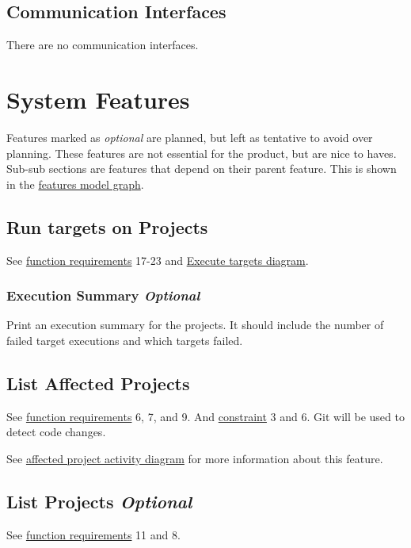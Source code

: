 \documentclass[11pt]{article}
\begin{document}
\subsection{Communication Interfaces}

There are no communication interfaces.

\section{System Features}

Features marked as \emph{optional} are planned, but left as tentative to avoid
over planning. These features are not essential for the product, but are nice to
haves. Sub-sub sections are features that depend on their parent feature. This
is shown in the \hyperref[fig:feature]{features model graph}.\\

\subsection{Run \Glspl{target} on Projects}

See \hyperref[sec:fun_req]{function requirements} 17-23 and
\hyperref[fig:act_exec]{Execute targets diagram}.

\subsubsection{Execution Summary \emph{Optional}}

Print an execution summary for the projects. It should include the number of
failed \glspl{target execution} and which \glspl{target} failed.

\subsection{List Affected Projects}

See \hyperref[sec:fun_req]{function requirements} 6, 7, and 9. And
\hyperref[sec:constraints]{constraint} 3 and 6. Git will be used to detect code changes.

See \hyperref[fig:act_aff]{affected project activity diagram} for more
information about this feature.

\subsection{List Projects \emph{Optional}}

See \hyperref[sec:fun_req]{function requirements} 11 and 8.
\end{document}
